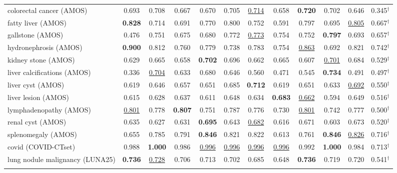 \begin{minipage}{\textwidth}
{\begin{tabular}{@{}lccccccccccc@{}}
colorectal cancer (AMOS) & 0.693 & 0.708 & 0.667 & 0.670 & 0.705 & \underline{0.714} & 0.658 & \textbf{0.720} & 0.702 & 0.646 & 0.345$^{\dagger}$ \\
fatty liver (AMOS) & \textbf{0.828} & 0.714 & 0.691 & 0.770 & 0.800 & 0.752 & 0.591 & 0.797 & 0.695 & \underline{0.805} & 0.667$^{\dagger}$ \\
gallstone (AMOS) & 0.476 & 0.751 & 0.675 & 0.680 & 0.772 & \underline{0.773} & 0.754 & 0.752 & \textbf{0.797} & 0.693 & 0.657$^{\dagger}$ \\
hydronephrosis (AMOS) & \textbf{0.900} & 0.812 & 0.760 & 0.779 & 0.738 & 0.783 & 0.754 & \underline{0.863} & 0.692 & 0.821 & 0.742$^{\dagger}$ \\
kidney stone (AMOS) & 0.629 & 0.665 & 0.658 & \textbf{0.702} & 0.696 & 0.662 & 0.665 & 0.607 & \underline{0.701} & 0.684 & 0.529$^{\dagger}$ \\
liver calcifications (AMOS) & 0.336 & \underline{0.704} & 0.633 & 0.680 & 0.646 & 0.560 & 0.471 & 0.545 & \textbf{0.734} & 0.491 & 0.497$^{\dagger}$ \\
liver cyst (AMOS) & 0.619 & 0.646 & 0.657 & 0.651 & 0.685 & \textbf{0.712} & 0.619 & 0.651 & 0.633 & \underline{0.692} & 0.550$^{\dagger}$ \\
liver lesion (AMOS) & 0.615 & 0.628 & 0.637 & 0.611 & 0.648 & 0.634 & \textbf{0.683} & \underline{0.662} & 0.594 & 0.649 & 0.516$^{\dagger}$ \\
lymphadenopathy (AMOS) & \underline{0.801} & 0.778 & \textbf{0.807} & 0.751 & 0.787 & 0.776 & 0.730 & \underline{0.801} & 0.742 & 0.777 & 0.500$^{\dagger}$ \\
renal cyst (AMOS) & 0.635 & 0.627 & 0.631 & \textbf{0.695} & 0.643 & \underline{0.682} & 0.616 & 0.671 & 0.603 & 0.673 & 0.520$^{\dagger}$ \\
splenomegaly (AMOS) & 0.655 & 0.785 & 0.791 & \textbf{0.846} & 0.821 & 0.822 & 0.613 & 0.761 & \textbf{0.846} & \underline{0.826} & 0.716$^{\dagger}$ \\
covid (COVID-CTset) & 0.988 & \textbf{1.000} & 0.986 & \underline{0.996} & \underline{0.996} & \underline{0.996} & \underline{0.996} & 0.992 & \textbf{1.000} & 0.984 & 0.713$^{\dagger}$ \\
lung nodule malignancy (LUNA25) & \textbf{0.736} & \underline{0.728} & 0.706 & 0.713 & 0.702 & 0.685 & 0.648 & \textbf{0.736} & 0.719 & 0.720 & 0.541$^{\dagger}$ \\
\addlinespace
\multicolumn{12}{@{}l}{\textit{joint (26\,000 steps)}} \\

\end{tabular}}
\end{minipage}
